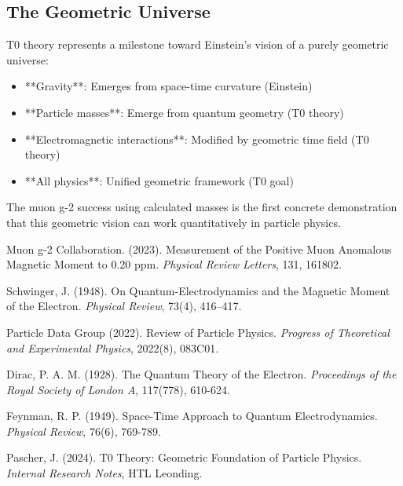 \documentclass[12pt,a4paper]{article}
\numberwithin{equation}{section}
\begin{document}
	\subsection{The Geometric Universe}
	
	T0 theory represents a milestone toward Einstein's vision of a purely geometric universe:
	\begin{itemize}
		\item **Gravity**: Emerges from space-time curvature (Einstein)
		\item **Particle masses**: Emerge from quantum geometry (T0 theory)
		\item **Electromagnetic interactions**: Modified by geometric time field (T0 theory)
		\item **All physics**: Unified geometric framework (T0 goal)
	\end{itemize}
	
	The muon g-2 success using calculated masses is the first concrete demonstration that this geometric vision can work quantitatively in particle physics.
	
	\begin{thebibliography}{99}
		
		Muon g-2 Collaboration. (2023). Measurement of the Positive Muon Anomalous Magnetic Moment to 0.20 ppm. \emph{Physical Review Letters}, 131, 161802.
		
		Schwinger, J. (1948). On Quantum-Electrodynamics and the Magnetic Moment of the Electron. \emph{Physical Review}, 73(4), 416–417.
		
		Particle Data Group (2022). Review of Particle Physics. \emph{Progress of Theoretical and Experimental Physics}, 2022(8), 083C01.
		
		Dirac, P. A. M. (1928). The Quantum Theory of the Electron. \emph{Proceedings of the Royal Society of London A}, 117(778), 610-624.
		
		Feynman, R. P. (1949). Space-Time Approach to Quantum Electrodynamics. \emph{Physical Review}, 76(6), 769-789.
		
		Pascher, J. (2024). T0 Theory: Geometric Foundation of Particle Physics. \emph{Internal Research Notes}, HTL Leonding.
		
	\end{thebibliography}
	
\end{document}
